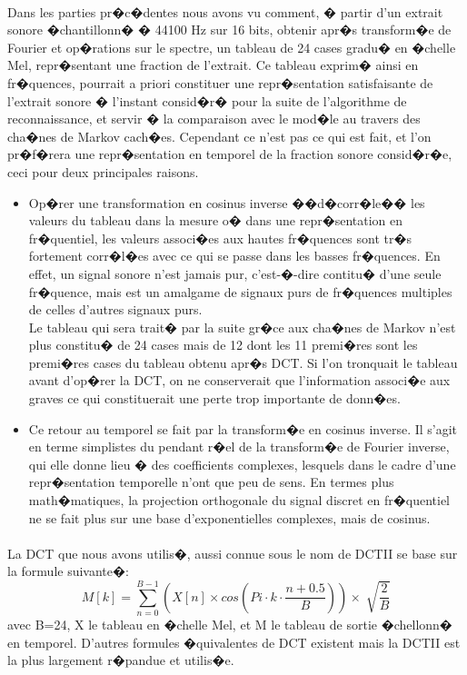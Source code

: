 \paragraph{}
	Dans les parties pr�c�dentes nous avons vu comment, � partir d'un extrait sonore �chantillonn� � 44100 Hz sur 16 bits, 
	obtenir apr�s transform�e de Fourier et op�rations sur le spectre, un tableau de 24 cases gradu� en �chelle Mel, 
	repr�sentant une fraction de l'extrait. Ce tableau exprim� ainsi en fr�quences, pourrait a priori constituer une 
	repr�sentation satisfaisante de l'extrait sonore � l'instant consid�r� pour la suite de l'algorithme de reconnaissance, 
	et servir � la comparaison avec le mod�le au travers des cha�nes de Markov cach�es. Cependant ce n'est pas ce qui est fait, 
	et l'on pr�f�rera une repr�sentation en temporel de la fraction sonore consid�r�e, ceci pour deux principales raisons.
\begin{itemize}
\item Op�rer une transformation en cosinus inverse ��d�corr�le�� les valeurs du tableau dans la mesure o� dans une repr�sentation 
en fr�quentiel, les valeurs associ�es aux hautes fr�quences sont tr�s fortement corr�l�es avec ce qui se passe dans les 
basses fr�quences. En effet, un signal sonore n'est jamais pur, c'est-�-dire contitu� d'une seule fr�quence, mais est un 
amalgame de signaux purs de fr�quences multiples de celles d'autres signaux purs.\\
Le tableau qui sera trait� par la suite gr�ce aux cha�nes de Markov n'est plus constitu� de 24 cases mais de 12 dont les 
11 premi�res sont les premi�res cases du tableau obtenu apr�s DCT. Si l'on tronquait le tableau avant d'op�rer la DCT, on 
ne conserverait que l'information associ�e aux graves ce qui constituerait une perte trop importante de donn�es. 
\item Ce retour au temporel se fait par la transform�e en cosinus inverse. Il s'agit en terme simplistes du pendant r�el de 
	la transform�e de Fourier inverse,  qui elle donne lieu � des coefficients complexes, lesquels dans le cadre d'une 
	repr�sentation temporelle n'ont que peu de sens. En termes plus math�matiques, la projection orthogonale du signal 
	discret en fr�quentiel ne se fait plus sur une base d'exponentielles complexes, mais de cosinus. 
\end{itemize}
\paragraph{}
	La DCT que nous avons utilis�, aussi connue sous le nom de DCTII se base sur la formule suivante�: 
	\[M[k] = \sum_{n=0}^{B-1}( X[n]\times cos(Pi\cdot k\cdot \frac{n+0.5}{B}) ) \times \sqrt[]{\frac{2}{B}}\] avec B=24, X le tableau en �chelle Mel, 
	et M le tableau de sortie �chellonn� en temporel. D'autres formules �quivalentes de DCT existent mais la 
	DCTII est la plus largement r�pandue et utilis�e.
